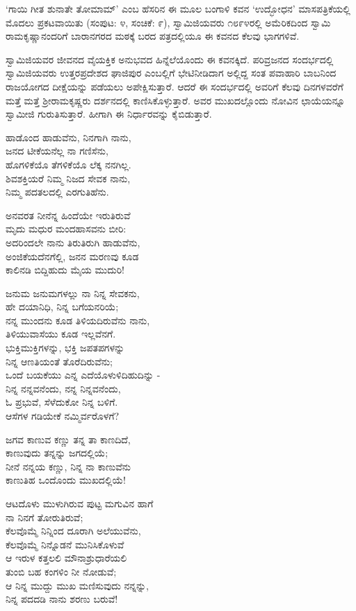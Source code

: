 ‘ಗಾಯಿ ಗೀತ ಶುನಾತೇ ತೋಮಾಮ್’ ಎಂಬ ಹೆಸರಿನ ಈ ಮೂಲ ಬಂಗಾಳಿ ಕವನ ‘ಉದ್ಭೋಧನ’ ಮಾಸಪತ್ರಿಕೆಯಲ್ಲಿ ಮೊದಲು ಪ್ರಕಟವಾಯಿತು (ಸಂಪುಟ: ೪, ಸಂಚಿಕೆ: ೯), ಸ್ವಾಮಿಜಿಯವರು ೧೮೯೪ರಲ್ಲಿ ಅಮೆರಿಕದಿಂದ ಸ್ವಾಮಿ ರಾಮಕೃಷ್ಣಾನಂದರಿಗೆ ಬಾರಾನಗರದ ಮಠಕ್ಕೆ ಬರದ ಪತ್ರದಲ್ಲಿಯೂ ಈ ಕವನದ ಕೆಲವು ಭಾಗಗಳಿವೆ.

ಸ್ವಾಮಿಜಿಯವರ ಜೀವನದ ವೈಯಕ್ತಿಕ ಅನುಭವದ ಹಿನ್ನೆಲೆಯೊಂದು ಈ ಕವನಕ್ಕಿದೆ. ಪರಿವ್ರಜನದ ಸಂದರ್ಭದಲ್ಲಿ ಸ್ವಾಮಿಜಿಯವರು ಉತ್ತರಪ್ರದೇಶದ ಘಾಜಿಪುರ ಎಂಬಲ್ಲಿಗೆ ಭೇಟಿನೀಡಿದಾಗ ಅಲ್ಲಿದ್ದ ಸಂತ ಪವಾಹಾರಿ ಬಾಬನಿಂದ ರಾಜಯೋಗದ ದೀಕ್ಷೆಯನ್ನು ಪಡೆಯಲು ಅಪೇಕ್ಷಿಸುತ್ತಾರೆ. ಆದರೆ ಈ ಸಂದರ್ಭದಲ್ಲಿ ಅವರಿಗೆ ಕೆಲವು ದಿನಗಳವರೆಗೆ ಮತ್ತೆ ಮತ್ತೆ ಶ‍್ರೀರಾಮಕೃಷ್ಣರು ದರ್ಶನದಲ್ಲಿ ಕಾಣಿಸಿಕೊಳ್ಳುತ್ತಾರೆ. ಅವರ ಮುಖದಲ್ಲೊಂದು ನೋವಿನ ಛಾಯೆಯನ್ನೂ ಸ್ವಾಮೀಜಿ ಗುರುತಿಸುತ್ತಾರೆ. ಹೀಗಾಗಿ ಈ ನಿರ್ಧಾರವನ್ನು ಕೈಬಿಡುತ್ತಾರೆ.

ಹಾಡೊಂದ ಹಾಡುವೆನು, ನಿನಗಾಗಿ ನಾನು,\\ಜನದ ಟೀಕೆಯನೆಲ್ಲ ನಾ ಗಣಿಸೆನು,\\ಹೊಗಳಿಕೆಯೊ ತೆಗಳಿಕೆಯೊ ಲೆಕ್ಕ ನನಗಿಲ್ಲ.\\ಶಿವಶಕ್ತಿಯರೆ ನಿಮ್ಮ ನಿಜದ ಸೇವಕ ನಾನು,\\ನಿಮ್ಮ ಪದತಲದಲ್ಲಿ ಎರಗುತಿಹೆನು.

ಅನವರತ ನೀನೆನ್ನ ಹಿಂದೆಯೇ ಇರುತಿರುವೆ\\ಮೃದು ಮಧುರ ಮಂದಹಾಸವನು ಬೀರಿ:\\ಅದರಿಂದಲೇ ನಾನು ತಿರುತಿರುಗಿ ಹಾಡುವೆನು,\\ಅಂಜಿಕೆಯದೆನಗೆಲ್ಲಿ, ಜನನ ಮರಣವು ಕೂಡ\\ಕಾಲಿನಡಿ ಬಿದ್ದಿಹುದು ಮೈಯ ಮುದುರಿ!

ಜನುಮ ಜನುಮಗಳಲ್ಲು ನಾ ನಿನ್ನ ಸೇವಕನು,\\ಹೇ ದಯಾನಿಧಿ, ನಿನ್ನ ಬಗೆಯನರಿಯೆ;\\ನನ್ನ ಮುಂದನು ಕೂಡ ತಿಳಿಯದಿರುವೆನು ನಾನು,\\ತಿಳಿಯುವಾಸೆಯು ಕೂಡ ಇಲ್ಲವೆನಗೆ.\\ಭುಕ್ತಿಮುಕ್ತಿಗಳನ್ನು, ಭಕ್ತಿ ಜಪತಪಗಳನ್ನು\\ನಿನ್ನ ಆಣತಿಯಂತೆ ತೊರೆದಿರುವೆನು;\\ಒಂದೆ ಬಯಕೆಯು ಎನ್ನ ಎದೆಯೊಳುಳಿದಿಹುದಿನ್ನು -\\ನಿನ್ನ ನನ್ನವನೆಂದು, ನನ್ನ ನಿನ್ನವನೆಂದು,\\ಓ ಪ್ರಭುವೆ, ಸೆಳೆದುಕೋ ನಿನ್ನ ಬಳಿಗೆ.\\ಆಸೆಗಳ ಗಡಿಯೇಕೆ ನಮ್ಮಿರ್ವರೊಳಗೆ?

ಜಗವ ಕಾಣುವ ಕಣ್ಣು ತನ್ನ ತಾ ಕಾಣದಿದೆ,\\ಕಾಣುವುದು ತನ್ನನ್ನು ಜಗದಲ್ಲಿಯೆ;\\ನೀನೆ ನನ್ನಯ ಕಣ್ಣು, ನಿನ್ನ ನಾ ಕಾಣುವೆನು\\ಕಾಣುತಿಹ ಒಂದೊಂದು ಮುಖದಲ್ಲಿಯೆ!

ಆಟದೊಳು ಮುಳುಗಿರುವ ಪುಟ್ಟ ಮಗುವಿನ ಹಾಗೆ\\ನಾ ನಿನಗೆ ತೋರುತಿರುವೆ;\\ಕೆಲವೊಮ್ಮೆ ನಿನ್ನಿಂದ ದೂರಾಗಿ ಅಲೆಯುವೆನು,\\ಕೆಲವೊಮ್ಮೆ ನಿನ್ನೊಡನೆ ಮುನಿಸಿಕೊಳುವೆ\\ಆ ಇರುಳ ಕತ್ತಲಲಿ ಮೌನಾಶ್ರುಧಾರೆಯಲಿ\\ತುಂಬಿ ಬಹ ಕಂಗಳಿಂ ನೀ ನೋಡುವೆ;\\ಆ ನಿನ್ನ ಮುದ್ದು ಮುಖ ಮಣಿಸುವುದು ನನ್ನನ್ನು,\\ನಿನ್ನ ಪದದಡಿ ನಾನು ಶರಣು ಬರುವೆ!

